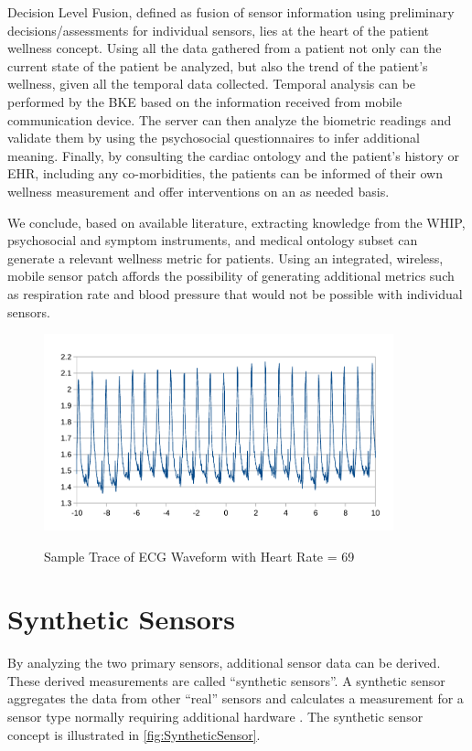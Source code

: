 Decision Level Fusion, defined as fusion of sensor information using preliminary decisions/assessments for individual sensors, lies at the heart of the patient wellness concept. Using all the data gathered from a patient not only can the current state of the patient be analyzed, but also the trend of the patient's wellness, given all the temporal data collected. Temporal analysis can be performed by the BKE based on the information received from mobile communication device. The server can then analyze the biometric readings and validate them by using the psychosocial questionnaires to infer additional meaning. Finally, by consulting the cardiac ontology and the patient's history or EHR, including any co-morbidities, the patients can be informed of their own wellness measurement and offer interventions on an as needed basis. 

We conclude, based on available literature, extracting knowledge from the WHIP, psychosocial and symptom instruments, and medical ontology subset can generate a relevant wellness metric for patients. Using an integrated, wireless, mobile sensor patch affords the possibility of generating additional metrics such as respiration rate and blood pressure that would not be possible with individual sensors.

\begin{figure}
	\begin{center}
		\label{fig:HR69}
		\includegraphics[scale=1,width=0.9\textwidth]{Images/HR69.pdf} 
		\caption{Sample Trace of ECG Waveform with Heart Rate = 69}
	\end{center}
\end{figure}

\section{Synthetic Sensors}
\label{sec:SyntheticSensors}
By analyzing the two primary sensors, additional sensor data can be derived.  These derived measurements are called “synthetic sensors”. A synthetic sensor aggregates the data from other “real” sensors and calculates a measurement for a sensor type normally requiring additional hardware \cite{Fortier2009}. The synthetic sensor concept is illustrated in \cref{fig:SyntheticSensor}.

